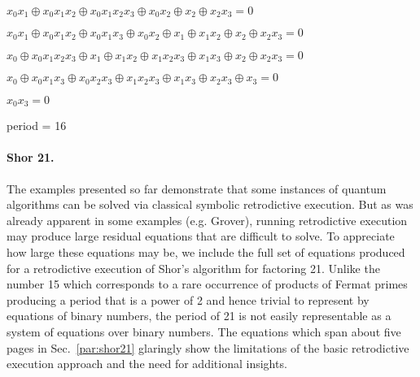 \documentclass{article}
\newcommand{\red}[1]{{\color{red}{#1}}}
\newcommand{\todo}[1]{\fbox{\begin{minipage}{40em}{\red{#1}}\end{minipage}}}
\begin{document}
\begin{refsection}
{$x_0x_1 \oplus x_0x_1x_2 \oplus x_0x_1x_2x_3 \oplus x_0x_2 \oplus x_2 \oplus x_2x_3 = 0$

$x_0x_1 \oplus x_0x_1x_2 \oplus x_0x_1x_3 \oplus x_0x_2 \oplus x_1 \oplus x_1x_2 \oplus x_2 \oplus x_2x_3 = 0$

$x_0 \oplus x_0x_1x_2x_3 \oplus x_1 \oplus x_1x_2 \oplus x_1x_2x_3 \oplus x_1x_3 \oplus x_2 \oplus x_2x_3 = 0$

$x_0 \oplus x_0x_1x_3 \oplus x_0x_2x_3 \oplus x_1x_2x_3 \oplus x_1x_3 \oplus x_2x_3 \oplus x_3 = 0$

$x_0x_3 = 0$

period = 16
}

\todo{ longest clause gives period; basically we have constraints on
  all the vars in the longest clause; $2^i$ where i is the index of
  the next variable is the period

Try: 1285, 196611, 327685
}

\todo{

  Known Fermat primes: 3, 5, 17, 257, 65537

  some equations are bigger; these are sweet

  is it ever the case that we have an even number of clauses that are 1 in
  the formula for Shor

  it should $a^x mod N = 1$ for two different $x$ ???

}

\paragraph*{Shor 21.} 
The examples presented so far demonstrate that some instances of
quantum algorithms can be solved via classical symbolic retrodictive
execution. But as was already apparent in some examples (e.g. Grover),
running retrodictive execution may produce large residual equations
that are difficult to solve. To appreciate how large these equations
may be, we include the full set of equations produced for a
retrodictive execution of Shor's algorithm for factoring 21. Unlike
the number 15 which corresponds to a rare occurrence of products of
Fermat primes producing a period that is a power of 2 and hence
trivial to represent by equations of binary numbers, the period of 21
is not easily representable as a system of equations over binary
numbers. The equations which span about five pages in
Sec.~\ref{par:shor21} glaringly show the limitations of the basic
retrodictive execution approach and the need for additional insights.


\end{refsection}
\end{document}
